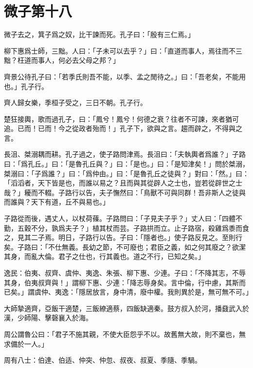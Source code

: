 \section[微子第十八]{微子第十八}

微子去之，箕子爲之奴，比干諫而死。孔子曰：「殷有三仁焉。」

柳下惠爲士師，三黜。人曰：「子未可以去乎？」曰：「直道而事人，焉往而不三黜？枉道而事人，何必去父母之邦？」

齊景公待孔子曰：「若季氏則吾不能，以季、孟之閒待之。」曰：「吾老矣，不能用也。」孔子行。

齊人歸女樂，季桓子受之，三日不朝。孔子行。

楚狂接輿，歌而過孔子，曰：「鳳兮！鳳兮！何德之衰？往者不可諫，來者猶可追。已而！已而！今之從政者殆而！」孔子下，欲與之言。趨而辟之，不得與之言。

長沮、桀溺耦而耕。孔子過之，使子路問津焉。長沮曰：「夫執輿者爲誰？」子路曰：「爲孔丘。」曰：「是魯孔丘與？」曰：「是也。」曰：「是知津矣！」問於桀溺，桀溺曰：「子爲誰？」曰：「爲仲由。」曰：「是魯孔丘之徒與？」對曰：「然。」曰：「滔滔者，天下皆是也，而誰以易之？且而與其從辟人之士也，豈若從辟世之士哉？」耰而不輟。子路行以告，夫子憮然曰：「鳥獸不可與同群！吾非斯人之徒與而誰與？天下有道，丘不與易也。」

子路從而後，遇丈人，以杖荷蓧。子路問曰：「子見夫子乎？」丈人曰：「四體不勤，五穀不分，孰爲夫子？」植其杖而芸。子路拱而立。止子路宿，殺雞爲黍而食之，見其二子焉。明日，子路行以告。子曰：「隱者也。」使子路反見之。至則行矣。子路曰：「不仕無義。長幼之節，不可廢也；君臣之義，如之何其廢之？欲潔其身，而亂大倫。君子之仕也，行其義也。道之不行，已知之矣。」

逸民：伯夷、叔齊、虞仲、夷逸、朱張、柳下惠、少連。子曰：「不降其志，不辱其身，伯夷叔齊與！」謂柳下惠、少連：「降志辱身矣。言中倫，行中慮，其斯而已矣。」謂虞仲、夷逸：「隱居放言，身中清，廢中權。我則異於是，無可無不可。」

大師摯適齊，亞飯干適楚，三飯繚適蔡，四飯缺適秦。鼓方叔入於河，播鼗武入於漢，少師陽、擊磬襄入於海。

周公謂魯公曰：「君子不施其親，不使大臣怨乎不以。故舊無大故，則不棄也，無求備於一人。」

周有八士：伯達、伯适、仲突、仲忽、叔夜、叔夏、季隨、季騧。
